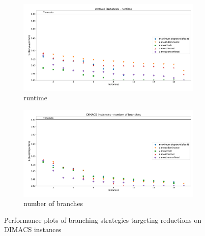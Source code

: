 \documentclass[12pt,a4paper,twoside]{scrartcl}
\numberwithin{equation}{section}
\begin{document}
\begin{figure}[hbt!]
	\begin{subfigure}{1\textwidth}
		\includegraphics[width=\textwidth]{images/plots/a2_dimacs_t}
		\caption{runtime}
	\end{subfigure}
	\begin{subfigure}{1\textwidth}
		\includegraphics[width=\textwidth]{images/plots/a2_dimacs_b}
		\caption{number of branches}
	\end{subfigure}
	\caption{Performance plots of branching strategies targeting reductions on DIMACS instances}
\end{figure}
\end{document}
